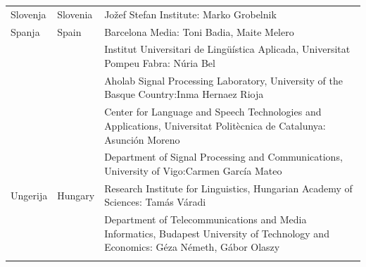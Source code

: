 \begin{longtable}{@{}llp{113mm}@{}}
  Slovenja & \textcolor{grey1}{Slovenia} & Jožef Stefan Institute: Marko Grobelnik \\ \addlinespace 
  Spanja & \textcolor{grey1}{Spain} & Barcelona Media: Toni Badia, Maite Melero \\ \addlinespace 
  & & Institut Universitari de Lingüística Aplicada, Universitat Pompeu Fabra: Núria Bel \\ \addlinespace 
  & & Aholab Signal Processing Laboratory, University of the Basque Country:\newline Inma Hernaez Rioja \\ \addlinespace 
  & & Center for Language and Speech Technologies and Applications, Universitat Politècnica de Catalunya:  Asunción Moreno \\ \addlinespace 
  & & Department of Signal Processing and Communications, University of Vigo:\newline Carmen García Mateo \\ \addlinespace 
  Ungerija & \textcolor{grey1}{Hungary} & Research Institute for Linguistics, Hungarian Academy of Sciences: Tamás Váradi\\  \addlinespace
  & & Department of Telecommunications and Media Informatics, Budapest University of Technology and Economics: Géza Németh, Gábor Olaszy\\ \addlinespace
\end{longtable}
\normalsize


\renewcommand*{\figureformat}{}
\renewcommand*{\captionformat}{}

